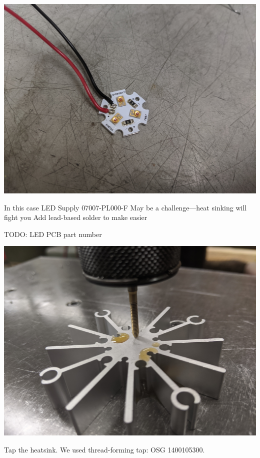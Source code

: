 \documentclass[11pt]{article}
\begin{document}
\begin{center}
  \includegraphics[width=\textwidth/2]{"./soldered-led.jpg"}
\end{center}

In this case LED Supply 07007-PL000-F
May be a challenge---heat sinking will fight you
Add lead-based solder to make easier

TODO: LED PCB part number

\begin{center}
  \includegraphics[width=\textwidth/2]{"./tap-heatsink.jpg"}
\end{center}

Tap the heatsink.
We used thread-forming tap: OSG 1400105300.
\end{document}
